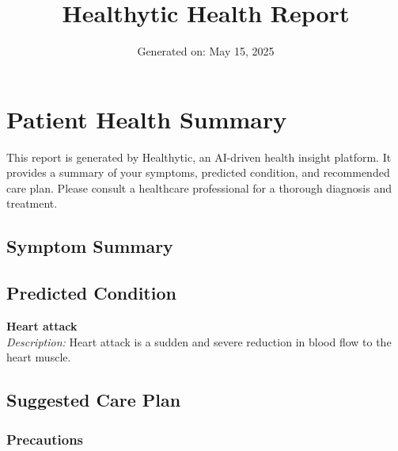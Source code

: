 \documentclass[a4paper,12pt]{article}
\title{\textbf{Healthytic Health Report}}
\author{}
\date{Generated on: May 15, 2025}
\begin{document}
\maketitle



\section*{Patient Health Summary}

This report is generated by Healthytic, an AI-driven health insight platform. It provides a summary of your symptoms, predicted condition, and recommended care plan. Please consult a healthcare professional for a thorough diagnosis and treatment.



\subsection*{Symptom Summary}

\begin{itemize}[leftmargin=*]



\end{itemize}



\subsection*{Predicted Condition}

\textbf{Heart attack} \\

\textit{Description:} Heart attack is a sudden and severe reduction in blood flow to the heart muscle.



\subsection*{Suggested Care Plan}

\subsubsection*{Precautions}

\begin{itemize}[leftmargin=*]



\end{itemize}
\end{document}
